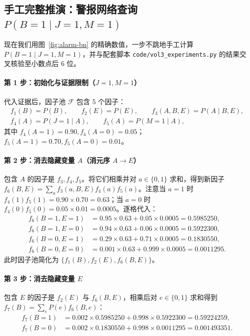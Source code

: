 \subsection{手工完整推演：警报网络查询 $P(B=1 \mid J=1, M=1)$}

现在我们用图~\ref{fig:alarm-bn} 的精确数值，一步不跳地手工计算 $P(B=1 \mid J=1, M=1)$，并与配套脚本 \texttt{code/\allowbreak vol3\_experiments.py} 的结果交叉核验至小数点后 6 位。

\paragraph{第 1 步：初始化与证据限制（$J=1, M=1$）}
代入证据后，因子池 $\mathcal{F}$ 包含 5 个因子：
\begin{gather*}
  f_1(B) = P(B),\qquad f_2(E) = P(E),\qquad f_3(A, B, E) = P(A\mid B, E), \\
  f_4(A) = P(J=1\mid A),\qquad f_5(A) = P(M=1\mid A),
\end{gather*}
其中 $f_4(A=1)=0.90, f_4(A=0)=0.05$；$f_5(A=1)=0.70, f_5(A=0)=0.01$。

\paragraph{第 2 步：消去隐藏变量 $A$（消元序 $A \to E$）}
包含 $A$ 的因子是 $f_3, f_4, f_5$。将它们相乘并对 $a \in \{0, 1\}$ 求和，得到新因子 $f_6(B, E) = \sum_{a} f_3(a, B, E) f_4(a) f_5(a)$。注意当 $a=1$ 时 $f_4(1)f_5(1) = 0.90 \times 0.70 = 0.63$；当 $a=0$ 时 $f_4(0)f_5(0) = 0.05 \times 0.01 = 0.0005$。逐格代入：
\begin{align*}
  f_6(B=1, E=1) &= 0.95 \times 0.63 + 0.05 \times 0.0005 = 0.5985250, \\
  f_6(B=1, E=0) &= 0.94 \times 0.63 + 0.06 \times 0.0005 = 0.5922300, \\
  f_6(B=0, E=1) &= 0.29 \times 0.63 + 0.71 \times 0.0005 = 0.1830550, \\
  f_6(B=0, E=0) &= 0.001 \times 0.63 + 0.999 \times 0.0005 = 0.0011295.
\end{align*}
此时因子池简化为 $\{f_1(B), f_2(E), f_6(B, E)\}$。

\paragraph{第 3 步：消去隐藏变量 $E$}
包含 $E$ 的因子是 $f_2(E)$ 与 $f_6(B, E)$，相乘后对 $e \in \{0, 1\}$ 求和得到 $f_7(B) = \sum_e P(e) f_6(B, e)$：
\begin{align*}
  f_7(B=1) &= 0.002 \times 0.5985250 + 0.998 \times 0.5922300 = 0.59224259, \\
  f_7(B=0) &= 0.002 \times 0.1830550 + 0.998 \times 0.0011295 = 0.001493351.
\end{align*}

